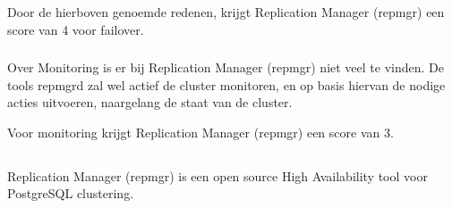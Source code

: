 Door de hierboven genoemde redenen, krijgt Replication Manager (repmgr) een score van 4 voor failover.

\subsubsection{}
\label{subsubsec:Monitoring}

Over Monitoring is er bij Replication Manager (repmgr) niet veel te vinden. De tools repmgrd zal wel actief de cluster monitoren, en op basis hiervan de nodige acties uitvoeren, naargelang de staat van de cluster.

Voor monitoring krijgt Replication Manager (repmgr) een score van 3.

\subsection{}
\label{subsec:Should have}



\subsubsection{}
\label{subsubsec:Actieve ondersteuning in 2020-2021}

\subsubsection{}
\label{subsubsec:Open source}

Replication Manager (repmgr) is een open source High Availability tool voor PostgreSQL clustering.

\subsection{}
\label{subsec:Could have}

\subsubsection{}
\label{subsubsec:Grafische interface}

